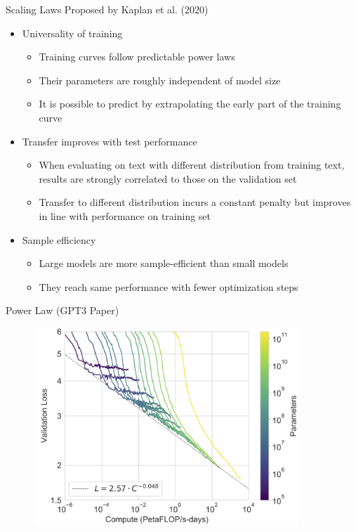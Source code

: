 \begin{vbframe}{Scaling Laws Proposed by Kaplan et al. (2020)}

\vfill

\begin{itemize}

	\item Universality of training
	\begin{itemize}
	\item Training curves follow predictable power laws
	\item Their parameters are roughly independent of model size
	\item It is possible to predict by extrapolating the early part of the training curve
	\end{itemize}

	\item Transfer improves with test performance
	\begin{itemize}
	\item When evaluating on text with different distribution from training text, results are strongly correlated to those on the validation set
	\item Transfer to different distribution incurs a constant penalty but improves in line with performance on training set
	\end{itemize}

	\item Sample efficiency
	\begin{itemize}
	\item Large models are more sample-efficient than small models
	\item They reach same performance with fewer optimization steps
	\end{itemize}

\end{itemize}

\vfill

\end{vbframe}


\begin{vbframe}{Power Law (GPT3 Paper)}

\begin{figure}
    \centering
    \includegraphics[width=10cm]{figure/losscompute.png}
\end{figure}
    
\end{vbframe}

